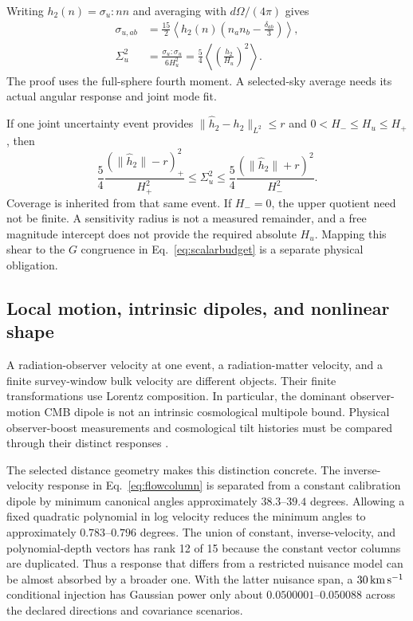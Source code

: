 Writing $h_2(n)=\sigma_u:nn$ and averaging with $d\Omega/(4\pi)$ gives
\begin{align}
 \sigma_{u,ab}&=\frac{15}{2}\left\langle h_2(n)
 \left(n_an_b-\frac{\delta_{ab}}3\right)\right\rangle,\nonumber\\
 \Sigma_u^2&=\frac{\sigma_u:\sigma_u}{6H_u^2}
 =\frac54\left\langle\left(\frac{h_2}{H_u}\right)^2\right\rangle.
 \label{eq:opticalidentity}
\end{align}
The proof uses the full-sphere fourth moment. A selected-sky average needs its actual angular response and joint mode fit.

If one joint uncertainty event provides $\|\hat h_2-h_2\|_{L^2}\leq r$ and $0<H_-\leq H_u\leq H_+$, then
\begin{equation}
 \frac54\frac{(\|\hat h_2\|-r)_+^2}{H_+^2}
 \leq\Sigma_u^2\leq
 \frac54\frac{(\|\hat h_2\|+r)^2}{H_-^2}.
 \label{eq:shearinterval}
\end{equation}
Coverage is inherited from that same event. If $H_-=0$, the upper quotient need not be finite. A sensitivity radius is not a measured remainder, and a free magnitude intercept does not provide the required absolute $H_u$. Mapping this shear to the $G$ congruence in Eq.~\eqref{eq:scalarbudget} is a separate physical obligation.

\subsection{Local motion, intrinsic dipoles, and nonlinear shape}

A radiation-observer velocity at one event, a radiation-matter velocity, and a finite survey-window bulk velocity are different objects. Their finite transformations use Lorentz composition. In particular, the dominant observer-motion CMB dipole is not an intrinsic cosmological multipole bound. Physical observer-boost measurements and cosmological tilt histories must be compared through their distinct responses \cite{PlanckBoost2014,Marcori2018}.

The selected distance geometry makes this distinction concrete. The inverse-velocity response in Eq.~\eqref{eq:flowcolumn} is separated from a constant calibration dipole by minimum canonical angles approximately $38.3$--$39.4$ degrees. Allowing a fixed quadratic polynomial in log velocity reduces the minimum angles to approximately $0.783$--$0.796$ degrees. The union of constant, inverse-velocity, and polynomial-depth vectors has rank 12 of 15 because the constant vector columns are duplicated. Thus a response that differs from a restricted nuisance model can be almost absorbed by a broader one. With the latter nuisance span, a $30\,\mathrm{km}\,\mathrm{s}^{-1}$ conditional injection has Gaussian power only about $0.0500001$--$0.050088$ across the declared directions and covariance scenarios.

